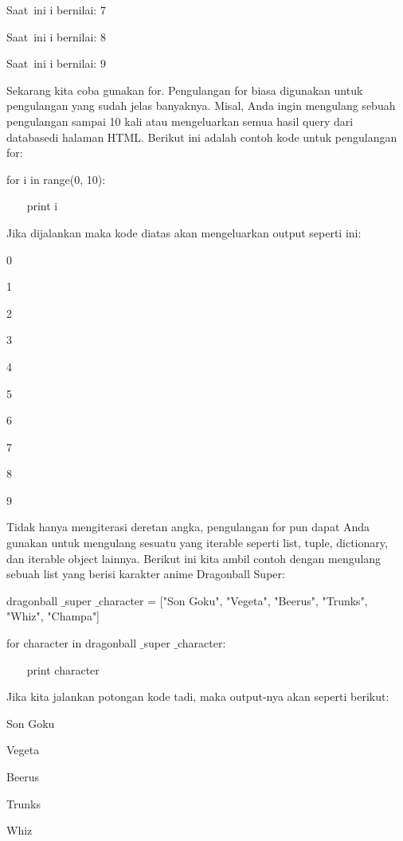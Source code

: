 Saat~ini i bernilai:  7 \par
Saat~ini i bernilai:  8 \par
Saat~ini i bernilai:  9 \par
\vspace{12pt}
Sekarang kita coba gunakan $  $for. Pengulangan $  $for $  $biasa digunakan untuk pengulangan yang sudah jelas banyaknya. Misal, Anda ingin mengulang sebuah pengulangan sampai 10 kali atau mengeluarkan semua hasil $  $query $  $dari $  $databasedi halaman HTML. Berikut ini adalah contoh kode untuk pengulangan $  $for: \par
for i in range(0, 10): \par
~~~ print i \par
Jika dijalankan maka kode diatas akan mengeluarkan $  $output $  $seperti ini: \par
\vspace{12pt}
0 \par
1 \par
2 \par
3 \par
4 \par
5 \par
6 \par
7 \par
8 \par
9 \par
Tidak hanya mengiterasi deretan angka, pengulangan $  $for $  $pun dapat Anda gunakan untuk mengulang sesuatu yang $  $iterable $  $seperti $  $list, $  $tuple, $  $dictionary, dan $  $iterable object $  $lainnya. Berikut ini kita ambil contoh dengan mengulang sebuah $  $list $  $yang berisi karakter anime Dragonball Super: \par
\vspace{12pt}
dragonball $  \_  $super $  \_  $character = ["Son Goku", "Vegeta", "Beerus", "Trunks", "Whiz", "Champa"] \par
for character in dragonball $  \_  $super $  \_  $character: \par
~~~ print character \par
\vspace{12pt}
Jika kita jalankan potongan kode tadi, maka $  $output-nya akan seperti berikut: \par
\vspace{12pt}
Son Goku \par
Vegeta \par
Beerus \par
Trunks \par
Whiz \par
